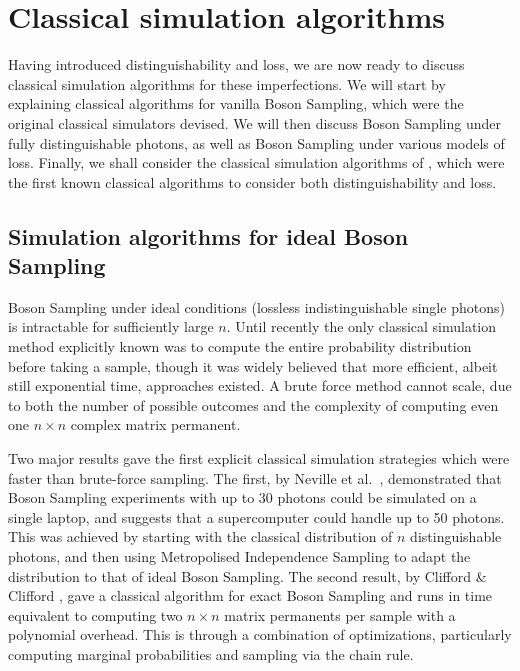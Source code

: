 \section{Classical simulation algorithms}
\label{sec:classical-simulations}

Having introduced distinguishability and loss, we are now ready to discuss classical simulation algorithms for these imperfections. We will start by explaining classical algorithms for vanilla Boson Sampling, which were the original classical simulators devised. We will then discuss Boson Sampling under fully distinguishable photons, as well as Boson Sampling under various models of loss. Finally, we shall consider the classical simulation algorithms of \cite{renema2018, renema2018loss}, which were the first known classical algorithms to consider both distinguishability and loss.

\subsection{Simulation algorithms for ideal Boson Sampling}

Boson Sampling under ideal conditions (lossless indistinguishable single photons) is intractable for sufficiently large $n$. 
Until recently the only classical simulation method explicitly known was to compute the entire probability distribution before taking a sample, though it was widely believed that more efficient, albeit still exponential time, approaches existed. 
A brute force method cannot scale, due to both the number of possible outcomes and the complexity of computing even one $n\times n$ complex matrix permanent.

Two major results gave the first explicit classical simulation strategies which were faster than brute-force sampling. 
The first, by Neville et al.~\cite{neville2017}, demonstrated that Boson Sampling experiments with up to 30 photons could be simulated on a single laptop, and suggests that a supercomputer could handle up to 50 photons. 
This was achieved by starting with the classical distribution of $n$ distinguishable photons, and then using Metropolised Independence Sampling to adapt the distribution to that of ideal Boson Sampling.
The second result, by Clifford \& Clifford \cite{clifford2017}, gave a classical algorithm for exact Boson Sampling and runs in time equivalent to computing two $n \times n$ matrix  permanents per sample with a polynomial overhead. 
This is through a combination of optimizations, particularly computing marginal probabilities and sampling via the chain rule.


